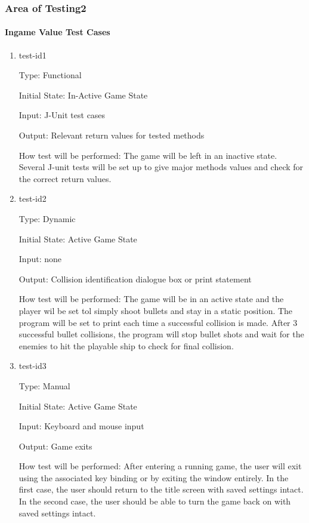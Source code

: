 \documentclass[12pt, titlepage]{article}
\begin{document}
\subsubsection{Area of Testing2}

\paragraph{Ingame Value Test Cases}

\begin{enumerate}

\item{test-id1\\}

Type: Functional

Initial State: In-Active Game State 

Input: J-Unit test cases

Output: Relevant return values for tested methods 

How test will be performed: The game will be left in an inactive state. Several J-unit tests will be set up to give major methods values and check for the correct return values.

\item{test-id2\\}

Type: Dynamic

Initial State: Active Game State 

Input: none

Output: Collision identification dialogue box or print statement 

How test will be performed: The game will be in an active state and the player wil be set tol simply shoot bullets and stay in a static position. The program will be set to print each time a successful collision is made. After 3 successful bullet collisions, the program will stop bullet shots and wait for the enemies to hit the playable ship to check for final collision. 

\item{test-id3\\}

Type: Manual

Initial State: Active Game State 

Input: Keyboard and mouse input

Output: Game exits 

How test will be performed: After entering a running game, the user will exit using the associated key binding or by exiting the window entirely. In the first case, the user should return to the title screen with saved settings intact. In the second case, the user should be able to turn the game back on with saved settings intact. 


\end{enumerate}
\end{document}
